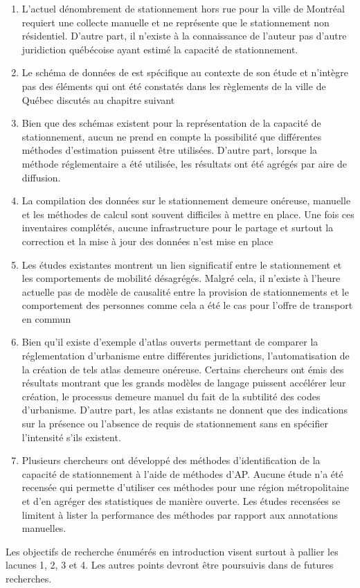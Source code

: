     \begin{enumerate}
        \item L'actuel dénombrement de stationnement hors rue pour la ville de Montréal requiert une collecte manuelle et ne représente que le stationnement non résidentiel. D'autre part, il n'existe à la connaissance de l'auteur pas d'autre juridiction québécoise ayant estimé la capacité de stationnement. 
        \item Le schéma de données de \textcite{li_sfba_2022} est spécifique au contexte de son étude \parencite{chester_inventorying_2022} et n'intègre pas des éléments qui ont été constatés dans les règlements de la ville de Québec discutés au chapitre suivant
        \item Bien que des schémas existent pour la représentation de la capacité de stationnement, aucun ne prend en compte la possibilité que différentes méthodes d'estimation puissent être utilisées. D'autre part, lorsque la méthode réglementaire a été utilisée, les résultats ont été agrégés par aire de diffusion.
        \item La compilation des données sur le stationnement demeure onéreuse, manuelle et les méthodes de calcul sont souvent difficiles à mettre en place. Une fois ces inventaires complétés, aucune infrastructure pour le partage et surtout la correction et la mise à jour des données n'est mise en place
        \item Les études existantes montrent un lien significatif entre le stationnement et les comportements de mobilité désagrégés. Malgré cela, il n'existe à l'heure actuelle pas de modèle de causalité entre la provision de stationnements et le comportement des personnes comme cela a été le cas pour l'offre de transport en commun \parencite{deschaintres_measuring_2021}
        \item Bien qu'il existe d'exemple d'atlas ouverts permettant de comparer la réglementation d'urbanisme entre différentes juridictions, l'automatisation de la création de tels atlas demeure onéreuse. Certains chercheurs ont émis des résultats montrant que les grands modèles de langage puissent accélérer leur création, le processus demeure manuel du fait de la subtilité des codes d'urbanisme. D'autre part, les atlas existants ne donnent que des indications sur la présence ou l'absence de requis de stationnement sans en spécifier l'intensité s'ils existent. 
        \item Plusieurs chercheurs ont développé des méthodes d'identification de la capacité de stationnement à l'aide de méthodes d'\ac{AP}. Aucune étude n'a été recensée qui permette d'utiliser ces méthodes pour une région métropolitaine et d'en agréger des statistiques de manière ouverte. Les études recensées se limitent à lister la performance des méthodes par rapport aux annotations manuelles.
    \end{enumerate}
    Les objectifs de recherche énumérés en introduction visent surtout à pallier les lacunes 1, 2, 3 et 4. Les autres points devront être poursuivis dans de futures recherches.